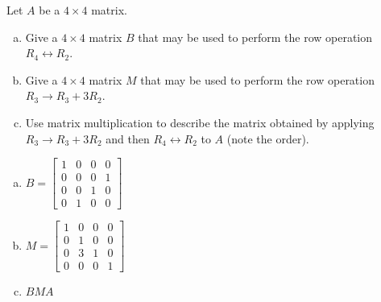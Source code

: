 
\begin{exerciseStatement}


Let \(A\) be a \(4 \times 4\) matrix.


\begin{enumerate}[(a)]
\item Give a \(4 \times 4\) matrix \(B\) that may be used to perform the row operation \( R_4 \leftrightarrow R_2 \).
\item Give a \(4 \times 4\) matrix \(M\) that may be used to perform the row operation \( R_3 \to R_3 + 3R_2 \).
\item Use matrix multiplication to describe the matrix obtained by applying \( R_3 \to R_3 + 3R_2 \) and then \( R_4 \leftrightarrow R_2 \) to \(A\) (note the order). 
\end{enumerate}
    
\end{exerciseStatement}
    
\begin{exerciseAnswer} 

\begin{enumerate}[(a)]
\item \(B= \left[\begin{array}{cccc}
1 & 0 & 0 & 0 \\
0 & 0 & 0 & 1 \\
0 & 0 & 1 & 0 \\
0 & 1 & 0 & 0
\end{array}\right] \)
\item \(M= \left[\begin{array}{cccc}
1 & 0 & 0 & 0 \\
0 & 1 & 0 & 0 \\
0 & 3 & 1 & 0 \\
0 & 0 & 0 & 1
\end{array}\right] \)
\item \(BMA\)
\end{enumerate}
    
\end{exerciseAnswer}
    
